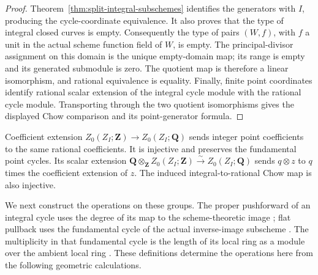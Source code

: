 \documentclass[11pt]{article}
\theoremstyle{definition}
\theoremstyle{remark}
\newcommand{\Q}{\mathbf Q}
\begin{document}
\begin{proof}
Theorem~\ref{thm:split-integral-subschemes} identifies the generators with
\(I\), producing the cycle-coordinate equivalence.  It also proves that
the type of integral closed curves is empty.  Consequently the type of
pairs \((W,f)\), with \(f\) a unit in the actual scheme function field of
\(W\), is empty.  The principal-divisor assignment on this domain is the
unique empty-domain map; its range is empty and its generated submodule is zero.
The quotient map is therefore a linear isomorphism, and rational
equivalence is equality.
Finally, finite point coordinates identify rational scalar extension of
the integral cycle module with the rational cycle module.  Transporting
through the two quotient isomorphisms gives the displayed Chow comparison
and its point-generator formula.
\end{proof}

Coefficient extension \(Z_0(Z_I;\mathbf Z)\to Z_0(Z_I;\Q)\) sends
integer point coefficients to the same rational coefficients.  It is
injective and preserves the fundamental point cycles.  Its scalar
extension \(\Q\otimes_{\mathbf Z}Z_0(Z_I;\mathbf Z)
\xrightarrow{\sim}Z_0(Z_I;\Q)\) sends \(q\otimes z\) to \(q\) times
the coefficient extension of \(z\).
The induced integral-to-rational Chow map is also injective.

We next construct the operations on these groups.  The proper pushforward
of an integral cycle uses the degree of its map to the scheme-theoretic
image \cite{StacksProperCyclePushforward}; flat pullback uses the
fundamental cycle of the actual inverse-image subscheme
\cite{StacksFlatCyclePullback}.  The multiplicity in that fundamental
cycle is the length of its local ring as a module over the ambient local
ring \cite{StacksFundamentalCycle}.  These definitions determine the
operations here from the following geometric calculations.
\end{document}
